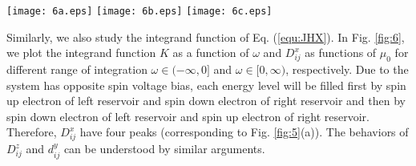 \documentclass[aps,prb,twocolumn,showpacs,amssymb]{revtex4-1}
\begin{document}
\begin{figure*}[!htp]
\centering
\texttt{[image: 6a.eps]}\hspace{-0.2cm}
\texttt{[image: 6b.eps]}\hspace{-0.5cm}
\texttt{[image: 6c.eps]}
\vspace{-0.0cm}
\caption{(colour online) The plots in (a) is the integrand function $K$ as functions of $\omega$ for $\mu_{L\uparrow}=\mu_{R\downarrow}=-7meV$, $\mu_{L\uparrow}=\mu_{R\downarrow}=-{\lambda}$, $\mu_{L\downarrow}=\mu_{R\uparrow}=-{\lambda}$, $\mu_{L\uparrow}=\mu_{R\downarrow}={\lambda}$, $\mu_{L\downarrow}=\mu_{R\uparrow}={\lambda}$ and $\mu_{L\downarrow}=\mu_{R\uparrow}=7meV$, respectively.
The plots in (b) is $D^{x}_{ij}$ as functions of $\mu$ for the bounds of integrand $\omega\in(-\infty,0]$ (solid line) and $\omega\in[0,\infty)$ (dash line), respectively.
Here, $\varepsilon=0meV, t=1meV, \delta=3meV, J=5meV, T_L=T_R=1K, \gamma_L=\gamma_R=\frac{1}{12}meV, \Delta{V}_\uparrow=2meV$.
The plots in (c) is schematic of how energy levels are occupied by electrons of the thermalized electronic reservoirs.}\label{fig:6}
\end{figure*}

Similarly, we also study the integrand function of Eq. (\ref{equ:JHX}). In Fig. \ref{fig:6}, we plot the integrand function $K$ as a function of $\omega$ and $D^{x}_{ij}$ as functions of $\mu_0$ for different range of integration $\omega\in(-\infty,0]$ and $\omega\in[0,\infty)$, respectively. Due to the system has opposite spin voltage bias, each energy level will be filled first by spin up electron of left reservoir and spin down electron of right reservoir and then by spin down electron of left reservoir and spin up electron of right reservoir. Therefore, $D^{x}_{ij}$ have four peaks (corresponding to Fig. \ref{fig:5}(a)). The behaviors of $D^{z}_{ij}$ and $d^{y}_{ij}$ can be understood by similar arguments.
\end{document}
